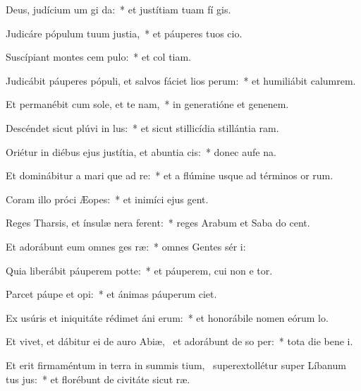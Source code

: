 \item Deus, judícium um gi da:~* et justítiam tuam fí gis.
\item Judicáre pópulum tuum  justia,~* et páuperes tuos  cio.
\item Suscípiant montes cem pulo:~* et col tiam.
\item Judicábit páuperes pópuli, et salvos fáciet lios perum:~* et humiliábit calumrem.
\item Et permanébit cum sole, et te nam,~* in generatióne et genenem.
\item Descéndet sicut plúvi in lus:~* et sicut stillicídia stillántia  ram.
\item Oriétur in diébus ejus justítia, et abuntia cis:~* donec aufe na.
\item Et dominábitur a mari que ad re:~* et a flúmine usque ad términos or rum.
\item Coram illo próci Æopes:~* et inimíci ejus  gent.
\item Reges Tharsis, et ínsulæ nera ferent:~* reges Arabum et Saba do cent.
\item Et adorábunt eum omnes ges ræ:~* omnes Gentes sér i:
\item Quia liberábit páuperem  potte:~* et páuperem, cui non e tor.
\item Parcet páupe et opi:~* et ánimas páuperum  ciet.
\item Ex usúris et iniquitáte rédimet áni erum:~* et honorábile nomen eórum  lo.
\item Et vivet, et dábitur ei de auro Abiæ,~\pscross{} et adorábunt de so per:~* tota die bene i.
\item Et erit firmaméntum in terra in summis tium,~\pscross{} superextollétur super Líbanum tus jus:~* et florébunt de civitáte sicut  ræ.
